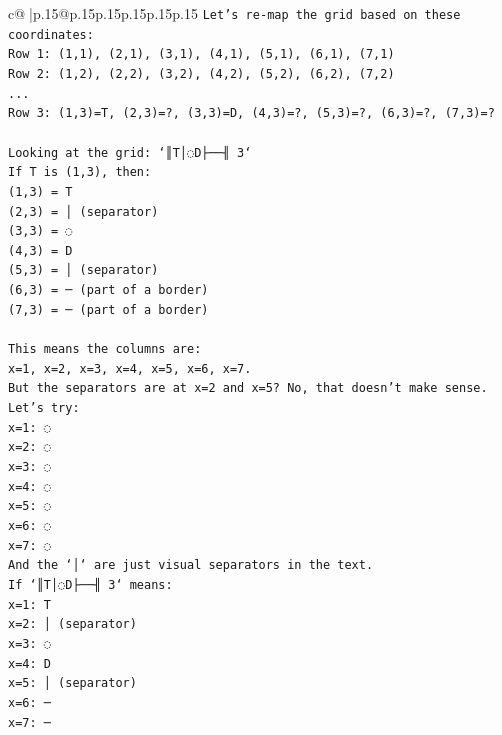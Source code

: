 \documentclass{article}
\begin{document}
{\begin{supertabular}{c@{$\;$}|p{.15\linewidth}@{}p{.15\linewidth}p{.15\linewidth}p{.15\linewidth}p{.15\linewidth}p{.15\linewidth}}
{{{\texttt{Let's re{-}map the grid based on these coordinates:} \\
\texttt{Row 1: (1,1), (2,1), (3,1), (4,1), (5,1), (6,1), (7,1)} \\
\texttt{Row 2: (1,2), (2,2), (3,2), (4,2), (5,2), (6,2), (7,2)} \\
\texttt{...} \\
\texttt{Row 3: (1,3)=T, (2,3)=?, (3,3)=D, (4,3)=?, (5,3)=?, (6,3)=?, (7,3)=?} \\
\\ 
\texttt{Looking at the grid: `║T│◌D├──╢ 3`} \\
\texttt{If T is (1,3), then:} \\
\texttt{(1,3) = T} \\
\texttt{(2,3) = │ (separator)} \\
\texttt{(3,3) = ◌} \\
\texttt{(4,3) = D} \\
\texttt{(5,3) = │ (separator)} \\
\texttt{(6,3) = ─ (part of a border)} \\
\texttt{(7,3) = ─ (part of a border)} \\
\\ 
\texttt{This means the columns are:} \\
\texttt{x=1, x=2, x=3, x=4, x=5, x=6, x=7.} \\
\texttt{But the separators are at x=2 and x=5? No, that doesn't make sense.} \\
\texttt{Let's try:} \\
\texttt{x=1: ◌} \\
\texttt{x=2: ◌} \\
\texttt{x=3: ◌} \\
\texttt{x=4: ◌} \\
\texttt{x=5: ◌} \\
\texttt{x=6: ◌} \\
\texttt{x=7: ◌} \\
\texttt{And the `│` are just visual separators in the text.} \\
\texttt{If `║T│◌D├──╢ 3` means:} \\
\texttt{x=1: T} \\
\texttt{x=2: │ (separator)} \\
\texttt{x=3: ◌} \\
\texttt{x=4: D} \\
\texttt{x=5: │ (separator)} \\
\texttt{x=6: ─} \\
\texttt{x=7: ─} \\
}}}
\end{supertabular}}
\end{document}
